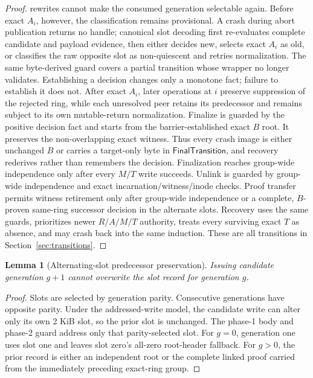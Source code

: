 \documentclass[10pt,twocolumn]{article}
\newtheorem{lemma}{Lemma}
\theoremstyle{remark}
\begin{document}
\begin{proof}
rewrites cannot make the consumed generation selectable again. Before exact $A_i$, however, the
classification remains provisional. A crash during abort publication returns no handle; canonical
slot decoding first re-evaluates complete candidate and payload evidence, then either decides new,
selects exact $A_i$ as old, or classifies the raw opposite slot as non-quiescent and retries
normalization. The same byte-derived guard covers a partial transition whose wrapper no longer
validates. Establishing a decision changes only a monotone fact; failure to establish it does not.
After exact $A_i$, later operations at $i$ preserve suppression of the rejected ring, while each
unresolved peer retains its predecessor and remains subject to its own mutable-return normalization.
Finalize is guarded by the positive decision fact and starts from the barrier-established exact
$B$ root. It preserves the non-overlapping exact witness. Thus every crash image is either unchanged
$B$ or carries a target-only byte in $\mathsf{FinalTransition}$, and recovery rederives rather than
remembers the decision. Finalization reaches group-wide independence only after every $M/T$ write
succeeds. Unlink is guarded by group-wide independence and exact incarnation/witness/inode checks.
Proof transfer permits witness retirement only after group-wide independence or a complete,
  $B$-proven same-ring successor decision in the alternate slots. Recovery uses the same guards, prioritizes
  newer $R/A/M/T$ authority, treats every surviving exact $T$ as absence, and may crash back into the
same induction. These are all transitions in Section~\ref{sec:transitions}.
\end{proof}

\begin{lemma}[Alternating-slot predecessor preservation]\label{lem:fallback}
Issuing candidate generation $g+1$ cannot overwrite the slot record for generation $g$.
\end{lemma}
\begin{proof}
Slots are selected by generation parity. Consecutive generations have opposite parity. Under the
addressed-write model, the candidate write can alter only its own 2 KiB slot, so the prior slot is
unchanged. The phase-1 body and phase-2 guard address only that parity-selected slot. For $g=0$,
generation one uses slot one and leaves slot zero's all-zero root-header
fallback. For
$g>0$, the prior record is either an independent root or the complete linked proof carried from the
immediately preceding exact-ring group.
\end{proof}
\end{document}
